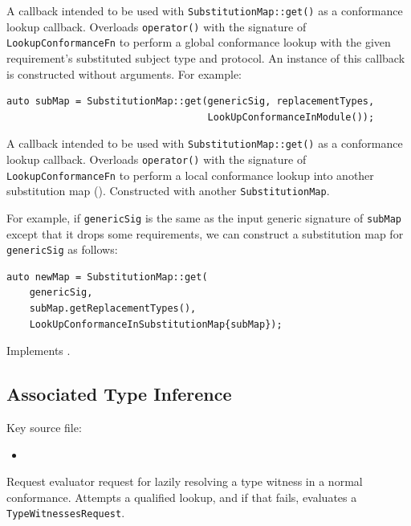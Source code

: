 \documentclass[../generics]{subfiles}
\begin{document}
A callback intended to be used with \texttt{SubstitutionMap::get()} as a conformance lookup callback. Overloads \texttt{operator()} with the signature of \texttt{LookupConformanceFn} to perform a global conformance lookup with the given requirement's substituted subject type and protocol. An instance of this callback is constructed without arguments. For example:
\begin{Verbatim}
auto subMap = SubstitutionMap::get(genericSig, replacementTypes,
                                   LookUpConformanceInModule());
\end{Verbatim}

A callback intended to be used with \texttt{SubstitutionMap::get()} as a conformance lookup callback. Overloads \texttt{operator()} with the signature of \texttt{LookupConformanceFn} to perform a local conformance lookup into another substitution map (). Constructed with another \texttt{SubstitutionMap}.

For example, if \texttt{genericSig} is the same as the input generic signature of \texttt{subMap} except that it drops some requirements, we can construct a substitution map for \texttt{genericSig} as follows:
\begin{Verbatim}
auto newMap = SubstitutionMap::get(
    genericSig,
    subMap.getReplacementTypes(),
    LookUpConformanceInSubstitutionMap{subMap});
\end{Verbatim}

Implements .

\subsection*{Associated Type Inference}

Key source file:
\begin{itemize}
\item {}
\end{itemize}

Request evaluator request for lazily resolving a type witness in a normal conformance. Attempts a qualified lookup, and if that fails, evaluates a \texttt{TypeWitnessesRequest}.
\end{document}
